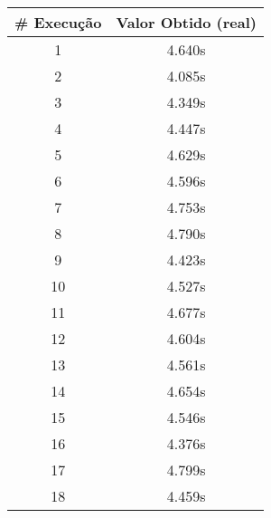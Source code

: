 \documentclass[11pt]{article}
\begin{document}
\begin{table}[!h]
\begin{center}
\begin{minipage}{0.48\textwidth}
\begin{tabular}{| c | c |}
			\hline
				\textbf{\# Execução} &  \textbf{Valor Obtido (real)} \\ \hline
				1 & 4.640s \\ \hline
				2 & 4.085s \\ \hline
				3 & 4.349s \\ \hline
				4 & 4.447s \\ \hline
				5 & 4.629s \\ \hline
				6 & 4.596s \\ \hline
				7 & 4.753s \\ \hline
				8 & 4.790s \\ \hline
				9 & 4.423s \\ \hline
				10 & 4.527s \\ \hline
				11 & 4.677s \\ \hline
				12 & 4.604s \\ \hline
				13 & 4.561s \\ \hline
				14 & 4.654s \\ \hline
				15 & 4.546s \\ \hline
				16 & 4.376s \\ \hline
				17 & 4.799s \\ \hline
				18 & 4.459s \\ \hline
			\end{tabular}
		\end{minipage}
	\end{center}
\end{table}
\end{document}
